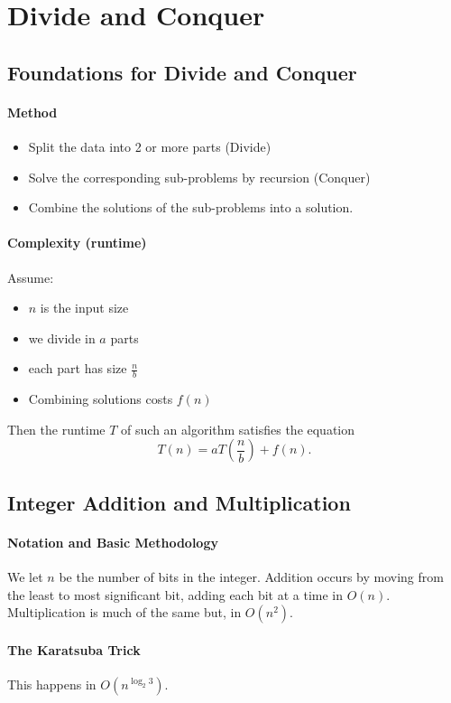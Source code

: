 
\section{Divide and Conquer}
\subsection{Foundations for Divide and Conquer}
\paragraph{Method} 
\begin{itemize}
    \item Split the data into 2 or more parts (Divide)
    \item Solve the corresponding sub-problems by recursion (Conquer)
    \item Combine the solutions of the sub-problems into a solution.
\end{itemize}

\paragraph{Complexity (runtime)} Assume:
\begin{itemize}
    \item \(n\) is the input size
    \item we divide in \(a\) parts
    \item each part has size \(\frac{n}{b}\)
    \item Combining solutions costs \(f(n)\)
\end{itemize}
Then the runtime \(T\) of such an algorithm satisfies the equation
\[T(n) = a T\left( \frac{n}{b} \right) + f(n).\]

\subsection{Integer Addition and Multiplication}

\paragraph{Notation and Basic Methodology}
We let \(n\) be the number of bits in the integer.
Addition occurs by moving from the least to most significant bit, adding each
bit at a time in \(O(n)\). Multiplication is much of the same but,
in \(O(n^2)\).

\paragraph{The Karatsuba Trick}
This happens in \(O(n^{\log_2 3})\).

